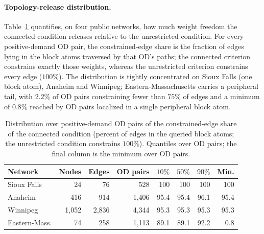 \paragraph{Topology-release distribution.}
Table~\ref{tab:topologydist} quantifies, on four public networks, how
much weight freedom the connected condition releases relative to the
unrestricted condition. For every positive-demand OD pair, the
constrained-edge share is the fraction of edges lying in the block
atoms traversed by that OD's paths; the connected criterion constrains
exactly those weights, whereas the unrestricted criterion constrains
every edge ($100\%$). The distribution is tightly concentrated on Sioux
Falls (one block atom), Anaheim and Winnipeg; Eastern-Massachusetts
carries a peripheral tail, with $2.2\%$ of OD pairs constraining fewer
than $75\%$ of edges and a minimum of $0.8\%$ reached by OD pairs
localized in a single peripheral block atom.
\begin{table}[pos=htbp]\centering\footnotesize
\caption{Distribution over positive-demand OD pairs of the
constrained-edge share of the connected condition (percent of edges in
the queried block atoms; the unrestricted condition constrains
$100\%$). Quantiles over OD pairs; the final column is the minimum
over OD pairs.}\label{tab:topologydist}
\begin{tabular*}{\tblwidth}{@{\extracolsep{\fill}}lrrrrrrr}
\toprule
Network & Nodes & Edges & OD pairs & $10\%$ & $50\%$ & $90\%$ & Min.\\
\midrule
Sioux Falls & 24 & 76 & 528 & 100 & 100 & 100 & 100\\
Anaheim & 416 & 914 & 1{,}406 & 95.4 & 95.4 & 96.1 & 95.4\\
Winnipeg & 1{,}052 & 2{,}836 & 4{,}344 & 95.3 & 95.3 & 95.3 & 95.3\\
Eastern-Mass. & 74 & 258 & 1{,}113 & 89.1 & 89.1 & 92.2 & 0.8\\
\bottomrule\end{tabular*}\end{table}

